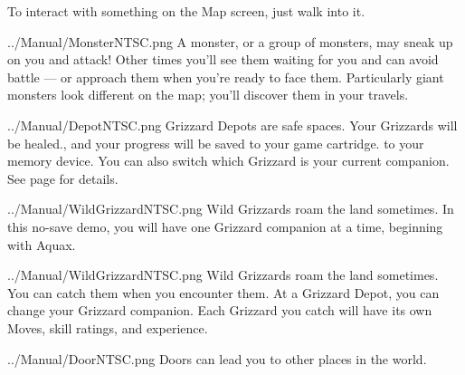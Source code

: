 \documentclass[10pt,twocolumn,openany,article]{memoir}
\begin{document}
To interact with something on the Map screen, just walk into it.

\vspace{14pt}

\lettrine[image=true,                lines=5,               findent=3pt,
nindent=3pt]{../Manual/MonsterNTSC.png}{}  A  monster,  or  a  group  of
monsters, may  sneak up on you  and attack! Other times  you'll see them
waiting for  you and can avoid  battle --- or approach  them when you're
ready to  face them. Particularly  giant monsters look different  on the
map; you'll discover them in your travels.

\vspace{14pt}

\lettrine[image=true,                lines=5,               findent=3pt,
nindent=3pt]{../Manual/DepotNTSC.png}{} Grizzard Depots are safe spaces.
Your  Grizzards will  be  healed\ifdefined\NOSAVE{}.{}\else{}, and  your
progress will  be saved \ifdefined\ATARIAGESAVE to  your game cartridge.
\else to your  memory device. \fi You can also  switch which Grizzard is
your  current   companion.  \fi  See   page  \pageref{sec:GrizzardDepot}
for details.

\vspace{14pt}

\ifdefined\NOSAVE

\lettrine[image=true,                lines=5,               findent=3pt,
nindent=3pt]{../Manual/WildGrizzardNTSC.png}{}  Wild Grizzards  roam the
land  sometimes.  In this  no-save  demo,  you  will have  one  Grizzard
companion at a time, beginning with Aquax.

\else

\lettrine[image=true,                lines=5,               findent=3pt,
nindent=3pt]{../Manual/WildGrizzardNTSC.png}{}  Wild Grizzards  roam the
land  sometimes.   You  can   catch  them   when  you   encounter  them.
At  a   Grizzard  Depot,  you   can  change  your   Grizzard  companion.
Each  Grizzard  you  catch  will  have its  own  Moves,  skill  ratings,
and experience.

\fi

\vspace{14pt}

\lettrine[image=true,                lines=5,               findent=3pt,
nindent=3pt]{../Manual/DoorNTSC.png}{}  Doors  can  lead  you  to  other
places in the world.

\vspace{30pt}
\end{document}
